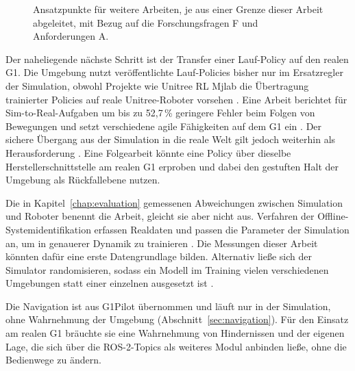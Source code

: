\begin{figure}[htbp]
  \centering
  
  \caption[Ansatzpunkte für weitere Arbeiten]{Ansatzpunkte für weitere Arbeiten, je aus einer Grenze dieser Arbeit abgeleitet, mit Bezug auf die Forschungsfragen F und Anforderungen A.}
  \label{fig:ausblick}
\end{figure}

Der naheliegende nächste Schritt ist der Transfer einer Lauf-Policy auf den realen G1.
Die Umgebung nutzt veröffentlichte Lauf-Policies bisher nur im Ersatzregler der Simulation, obwohl Projekte wie Unitree RL Mjlab die Übertragung trainierter Policies auf reale Unitree-Roboter vorsehen \cite{UnitreeRLMjlab}.
Eine Arbeit berichtet für Sim-to-Real-Aufgaben um bis zu 52,7\,\% geringere Fehler beim Folgen von Bewegungen und setzt verschiedene agile Fähigkeiten auf dem G1 ein \cite{He2025}. Der sichere Übergang aus der Simulation in die reale Welt gilt jedoch weiterhin als Herausforderung \cite{Tong2024}.
Eine Folgearbeit könnte eine Policy über dieselbe Herstellerschnittstelle am realen G1 erproben und dabei den gestuften Halt der Umgebung als Rückfallebene nutzen.

Die in Kapitel~\ref{chap:evaluation} gemessenen Abweichungen zwischen Simulation und Roboter benennt die Arbeit, gleicht sie aber nicht aus.
Verfahren der Offline-Systemidentifikation erfassen Realdaten und passen die Parameter der Simulation an, um in genauerer Dynamik zu trainieren \cite{He2025}.
Die Messungen dieser Arbeit könnten dafür eine erste Datengrundlage bilden.
Alternativ ließe sich der Simulator randomisieren, sodass ein Modell im Training vielen verschiedenen Umgebungen statt einer einzelnen ausgesetzt ist \cite{Tobin2017}.

Die Navigation ist aus G1Pilot übernommen und läuft nur in der Simulation, ohne Wahrnehmung der Umgebung (Abschnitt~\ref{sec:navigation}).
Für den Einsatz am realen G1 bräuchte sie eine Wahrnehmung von Hindernissen und der eigenen Lage, die sich über die ROS-2-Topics als weiteres Modul anbinden ließe, ohne die Bedienwege zu ändern.

